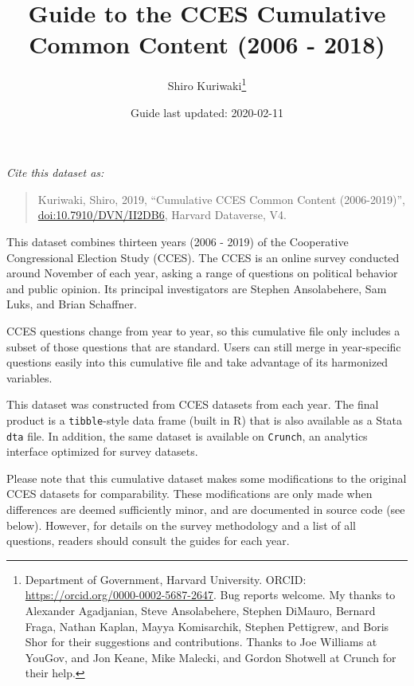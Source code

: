 \documentclass[10pt,article,oneside]{memoir}
\title{ \LARGE\textbf{Guide to the CCES Cumulative Common Content (2006
- 2018)}}
\author{Shiro Kuriwaki\thanks{Department of Government, Harvard
University. ORCID: \url{https://orcid.org/0000-0002-5687-2647}. Bug
reports welcome. My thanks to Alexander Agadjanian, Steve Ansolabehere,
Stephen DiMauro, Bernard Fraga, Nathan Kaplan, Mayya Komisarchik,
Stephen Pettigrew, and Boris Shor for their suggestions and
contributions. Thanks to Joe Williams at YouGov, and Jon Keane, Mike
Malecki, and Gordon Shotwell at Crunch for their help.}  }
\date{Guide last updated: 2020-02-11}
\theoremstyle{definition}
\begin{document}
\maketitle





\renewcommand\UrlFont{\color{crimson}\ttfamily}

\noindent \emph{Cite this dataset as:}

\begin{quote}
Kuriwaki, Shiro, 2019, ``Cumulative CCES Common Content (2006-2019)'',
\href{https://dataverse.harvard.edu/dataset.xhtml?persistentId=doi:10.7910/DVN/II2DB6}{\url{doi:10.7910/DVN/II2DB6}},
Harvard Dataverse, V4.
\end{quote}

\bigskip

This dataset combines thirteen years (2006 - 2019) of the Cooperative
Congressional Election Study (CCES). The CCES is an online survey
conducted around November of each year, asking a range of questions on
political behavior and public opinion. Its principal investigators are
Stephen Ansolabehere, Sam Luks, and Brian Schaffner.

\bigskip

CCES questions change from year to year, so this cumulative file only
includes a subset of those questions that are standard. Users can still
merge in year-specific questions easily into this cumulative file and
take advantage of its harmonized variables.

\bigskip

This dataset was constructed from CCES datasets from each year. The
final product is a \texttt{tibble}-style data frame (built in R) that is
also available as a Stata \texttt{dta} file. In addition, the same
dataset is available on \texttt{Crunch}, an analytics interface
optimized for survey datasets.

\bigskip

Please note that this cumulative dataset makes some modifications to the
original CCES datasets for comparability. These modifications are only
made when differences are deemed sufficiently minor, and are documented
in source code (see below). However, for details on the survey
methodology and a list of all questions, readers should consult the
guides for each year.

\vspace{1cm}
\end{document}
